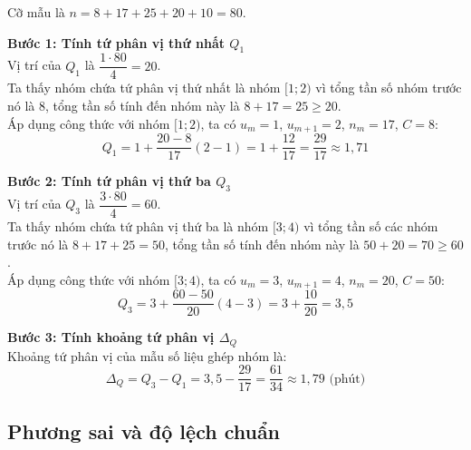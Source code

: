\documentclass[12pt]{article}
\begin{document}
	\begin{loigiai}
		Cỡ mẫu là $n = 8 + 17 + 25 + 20 + 10 = 80$.
		
		\textbf{Bước 1: Tính tứ phân vị thứ nhất $Q_1$} \\
		Vị trí của $Q_1$ là $\dfrac{1 \cdot 80}{4} = 20$. \\
		Ta thấy nhóm chứa tứ phân vị thứ nhất là nhóm $[1; 2)$ vì tổng tần số nhóm trước nó là 8, tổng tần số tính đến nhóm này là $8 + 17 = 25 \ge 20$. \\
		Áp dụng công thức với nhóm $[1; 2)$, ta có $u_m = 1$, $u_{m+1} = 2$, $n_m = 17$, $C = 8$:
		\[ Q_1 = 1 + \frac{20 - 8}{17}(2 - 1) = 1 + \frac{12}{17} = \frac{29}{17} \approx 1,71 \]
		
		\textbf{Bước 2: Tính tứ phân vị thứ ba $Q_3$} \\
		Vị trí của $Q_3$ là $\dfrac{3 \cdot 80}{4} = 60$. \\
		Ta thấy nhóm chứa tứ phân vị thứ ba là nhóm $[3; 4)$ vì tổng tần số các nhóm trước nó là $8 + 17 + 25 = 50$, tổng tần số tính đến nhóm này là $50 + 20 = 70 \ge 60$. \\
		Áp dụng công thức với nhóm $[3; 4)$, ta có $u_m = 3$, $u_{m+1} = 4$, $n_m = 20$, $C = 50$:
		\[ Q_3 = 3 + \frac{60 - 50}{20}(4 - 3) = 3 + \frac{10}{20} = 3,5 \]
		
		\textbf{Bước 3: Tính khoảng tứ phân vị $\Delta_Q$} \\
		Khoảng tứ phân vị của mẫu số liệu ghép nhóm là:
		\[ \Delta_Q = Q_3 - Q_1 = 3,5 - \frac{29}{17} = \frac{61}{34} \approx 1,79 \text{ (phút)} \]
	\end{loigiai}
	
	
	\subsection{Phương sai và độ lệch chuẩn}
	
\end{document}
